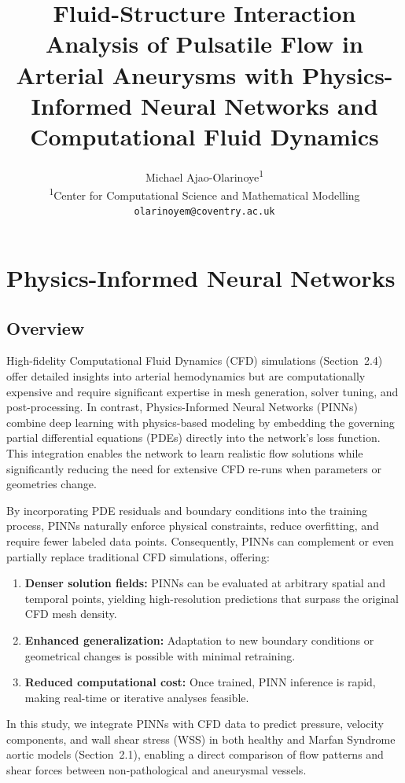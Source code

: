\documentclass[12pt, a4paper]{article}
\title{
    \vspace{-2cm} %
    \large \textbf{Fluid-Structure Interaction Analysis of Pulsatile Flow in Arterial Aneurysms with Physics-Informed Neural Networks and Computational Fluid Dynamics}\\
}
\author{
    Michael Ajao-Olarinoye\textsuperscript{1} \\
    \textsuperscript{1}Center for Computational Science and Mathematical Modelling \\
    \texttt{olarinoyem@coventry.ac.uk}
}
\date{}
\begin{document}
\maketitle


\section{Physics-Informed Neural Networks}
\label{sec:PINNs}

\subsection{Overview}
\label{sec:PINN_Overview}
High-fidelity Computational Fluid Dynamics (CFD) simulations (Section~2.4) offer detailed insights into arterial hemodynamics but are computationally expensive and require significant expertise in mesh generation, solver tuning, and post-processing. In contrast, Physics-Informed Neural Networks (PINNs)~\citep{raissi2019physics} combine deep learning with physics-based modeling by embedding the governing partial differential equations (PDEs) directly into the network's loss function. This integration enables the network to learn realistic flow solutions while significantly reducing the need for extensive CFD re-runs when parameters or geometries change.

By incorporating PDE residuals and boundary conditions into the training process, PINNs naturally enforce physical constraints, reduce overfitting, and require fewer labeled data points. Consequently, PINNs can complement or even partially replace traditional CFD simulations, offering:
\begin{enumerate}[label=\arabic*)]
    \item \textbf{Denser solution fields:} PINNs can be evaluated at arbitrary spatial and temporal points, yielding high-resolution predictions that surpass the original CFD mesh density.
    \item \textbf{Enhanced generalization:} Adaptation to new boundary conditions or geometrical changes is possible with minimal retraining.
    \item \textbf{Reduced computational cost:} Once trained, PINN inference is rapid, making real-time or iterative analyses feasible.
\end{enumerate}
In this study, we integrate PINNs with CFD data to predict pressure, velocity components, and wall shear stress (WSS) in both healthy and Marfan Syndrome aortic models (Section~2.1), enabling a direct comparison of flow patterns and shear forces between non-pathological and aneurysmal vessels.
\end{document}
